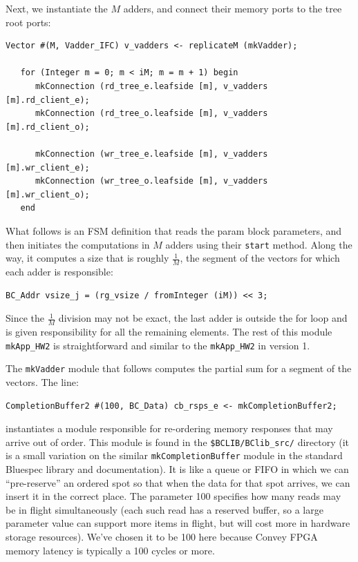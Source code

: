 \documentclass[twoside,letterpaper,11pt]{article}
\begin{document}
Next, we instantiate the $M$ adders, and connect their memory ports to
the tree root ports:
\begin{Verbatim}[frame=single, label=App\_HW\_v2.bsv] 
   Vector #(M, Vadder_IFC) v_vadders <- replicateM (mkVadder);

   for (Integer m = 0; m < iM; m = m + 1) begin
      mkConnection (rd_tree_e.leafside [m], v_vadders [m].rd_client_e);
      mkConnection (rd_tree_o.leafside [m], v_vadders [m].rd_client_o);

      mkConnection (wr_tree_e.leafside [m], v_vadders [m].wr_client_e);
      mkConnection (wr_tree_o.leafside [m], v_vadders [m].wr_client_o);
   end
\end{Verbatim}

What follows is an FSM definition that reads the param block
parameters, and then initiates the computations in $M$ adders using
their \verb|start| method.  Along the way, it computes a size that is
roughly $\frac{1}{M}$, the segment of the vectors for which each adder
is responsible:
\begin{Verbatim}[frame=single, label=App\_HW\_v2.bsv] 
	    BC_Addr vsize_j = (rg_vsize / fromInteger (iM)) << 3;
\end{Verbatim}

Since the $\frac{1}{M}$ division may not be exact, the last adder is
outside the for loop and is given responsibility for all the remaining
elements.  The rest of this module \verb|mkApp_HW2| is straightforward
and similar to the \verb|mkApp_HW2| in version 1.

The \verb|mkVadder| module that follows computes the partial sum for a
segment of the vectors.  The line:
\begin{Verbatim}[frame=single, label=App\_HW\_v2.bsv] 
   CompletionBuffer2 #(100, BC_Data) cb_rsps_e <- mkCompletionBuffer2;
\end{Verbatim}

instantiates a module responsible for re-ordering memory responses
that may arrive out of order.  This module is found in the
\verb|$BCLIB/BClib_src/| directory (it is a small variation on the
similar \verb|mkCompletionBuffer| module in the standard Bluespec
library and documentation). It is like a queue or FIFO in which we can
``pre-reserve'' an ordered spot so that when the data for that spot
arrives, we can insert it in the correct place. The parameter 100
specifies how many reads may be in flight simultaneously (each such
read has a reserved buffer, so a large parameter value can support
more items in flight, but will cost more in hardware storage
resources).  We've chosen it to be 100 here because Convey FPGA memory
latency is typically a 100 cycles or more.
\end{document}
